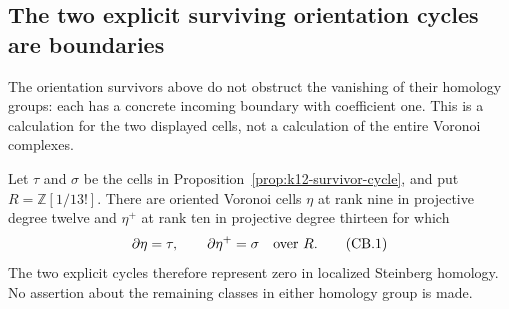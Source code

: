 \subsection{The two explicit surviving orientation cycles are boundaries}
\label{subsec:k12-survivor-coface}

The orientation survivors above do not obstruct the vanishing of their
homology groups: each has a concrete incoming boundary with coefficient
one.  This is a calculation for the two displayed cells, not a
calculation of the entire Voronoi complexes.

\begin{proposition}
\label{prop:k12-survivor-boundary}
Let $\tau$ and $\sigma$ be the cells in
Proposition~\ref{prop:k12-survivor-cycle}, and put
$R=\mathbb Z[1/13!]$. There are oriented Voronoi cells $\eta$ at
rank nine in projective degree twelve and $\eta^+$ at rank ten
in projective degree thirteen for which
\[
             \partial\eta=\tau,\qquad
             \partial\eta^+=\sigma
             \quad\hbox{over }R.                         \tag{CB.1}
\]
The two explicit cycles therefore represent zero in localized
Steinberg homology. No assertion about the remaining classes in
either homology group is made.
\end{proposition}

